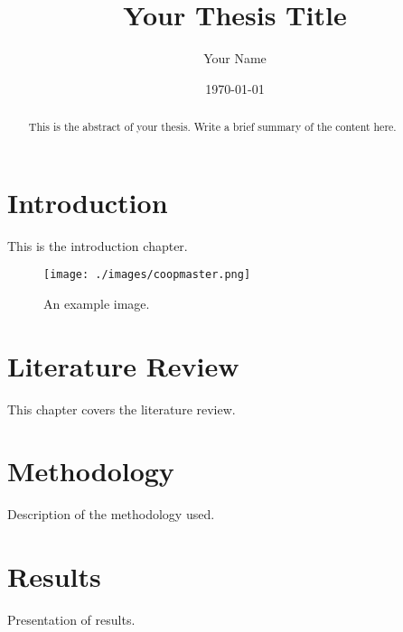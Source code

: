 \documentclass[12pt, a4paper]{report}
\begin{document}
\title{Your Thesis Title}
\author{Your Name}
\date{\today}
\maketitle

\begin{abstract}
  This is the abstract of your thesis. Write a brief summary of the content here.
\end{abstract}

\tableofcontents

\printindex

\chapter{Introduction}
\label{chap:introduction}
This is the introduction chapter.

\begin{figure}[h!]
  \centering
  \texttt{[image: ./images/coopmaster.png]}
  \caption{An example image.}
  \label{fig:example}
\end{figure}




\chapter{Literature Review}
\label{chap:literature}
This chapter covers the literature review.


\chapter{Methodology}
\label{chap:methodology}
Description of the methodology used.

\chapter{Results}
\label{chap:results}
Presentation of results.


\end{document}
